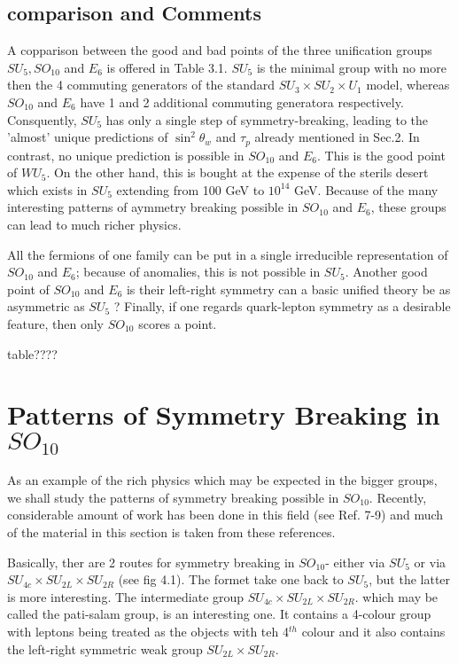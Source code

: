 \subsection{comparison and Comments}

A copparison between the good and bad points of the three unification groups $SU_{5}, SO_{10}$ and $E_{6}$ is offered in Table 3.1. $SU_{5}$ is the minimal group with no more then the 4 commuting generators of the standard $SU_{3} \times SU_{2} \times U_{1}$ model, whereas $SO_{10}$ and $E_{6}$ have 1 and 2 additional commuting generatora respectively. Consquently, $SU_{5}$ has only a single step of symmetry-breaking, leading to the 'almost' unique predictions of $\sin^{2} \theta_{w}$ and $\tau_{p}$ already mentioned in Sec.2. In contrast, no unique prediction is possible in $SO_{10}$ and $E_{6}$. This is the good point of $WU_{5}$. On the other hand, this is bought at the expense of the sterils desert which exists in $SU_{5}$ extending from 100 GeV to $10^{14}$ GeV. Because of the many interesting patterns of aymmetry breaking possible in $SO_{10}$ and $E_{6}$, these groups can lead to much richer physics.

All the fermions of one family can be put in a single irreducible representation of $SO_{10}$ and $E_{6}$; because of anomalies, this is not possible in $SU_{5}$. Another good point of $SO_{10}$ and $E_{6}$ is their left-right symmetry can a basic unified theory be as asymmetric as $SU_{5}$ ? Finally, if one regards quark-lepton symmetry as a desirable feature, then only $SO_{10}$ scores a point.

table????


\section{Patterns of Symmetry Breaking in $SO_{10}$}

As an example of the rich physics which may be expected in the bigger groups, we shall study the patterns of symmetry breaking possible in $SO_{10}$. Recently, considerable amount of work has been done in this field (see Ref. 7-9) and much of the material in this section is taken from these references.

Basically, ther are 2 routes for symmetry breaking in $SO_{10}$- either via $SU_{5}$ or via $SU_{4c} \times SU_{2L} \times SU_{2R}$ (see fig 4.1). The formet take one back to $SU_{5}$, but the latter is more interesting. The intermediate group $SU_{4c} \times SU_{2L} \times SU_{2R}$. which may be called the pati-salam group, is an interesting one. It contains a 4-colour group with leptons being treated as the objects with teh 4$^{th}$ colour and it also contains the left-right symmetric weak group $SU_{2L} \times SU_{2R}$.

